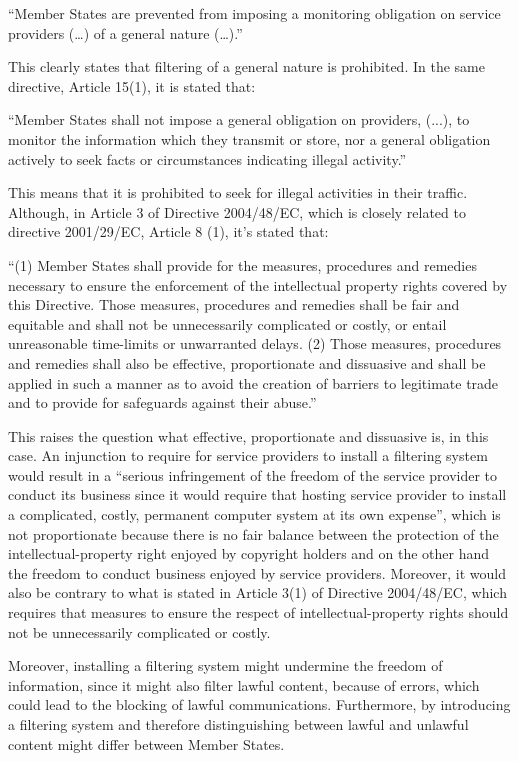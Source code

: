 “Member States are prevented from imposing a monitoring obligation on service providers (…) of a general nature (…).”

This clearly states that filtering of a general nature is prohibited. In the same directive, Article 15(1), it is stated that: 

“Member States shall not impose a general obligation on providers, (...), to monitor the information which they transmit or store, nor a general obligation actively to seek facts or circumstances indicating illegal activity.”

This means that it is prohibited to seek for illegal activities in their traffic. Although, in Article 3 of Directive 2004/48/EC, which is closely related to directive 2001/29/EC, Article 8 (1), it’s stated that: 

“(1) Member States shall provide for the measures, procedures and remedies necessary to ensure the enforcement of the intellectual property rights covered by this Directive. Those measures, procedures and remedies shall be fair and equitable and shall not be unnecessarily complicated or costly, or entail unreasonable time-limits or unwarranted delays.
(2) Those measures, procedures and remedies shall also be effective, proportionate and dissuasive and shall be applied in such a manner as to avoid the creation of barriers to legitimate trade and to provide for safeguards against their abuse.”

This raises the question what effective, proportionate and dissuasive is, in this case. An injunction to require for service providers to install a filtering system would result in a “serious infringement of the freedom of the service provider to conduct its business since it would require that hosting service provider to install a complicated, costly, permanent computer system at its own expense”, which is not proportionate because there is no fair balance between the protection of the intellectual-property right enjoyed by copyright holders and on the other hand the freedom to conduct business enjoyed by service providers. Moreover, it would also be contrary to what is stated in Article 3(1) of Directive 2004/48/EC, which requires that measures to ensure the respect of intellectual-property rights should not be unnecessarily complicated or costly.

Moreover, installing a filtering system might undermine the freedom of information, since it might also filter lawful content, because of errors, which could lead to the blocking of lawful communications. Furthermore, by introducing a filtering system and therefore distinguishing between lawful and unlawful content might differ between Member States.

